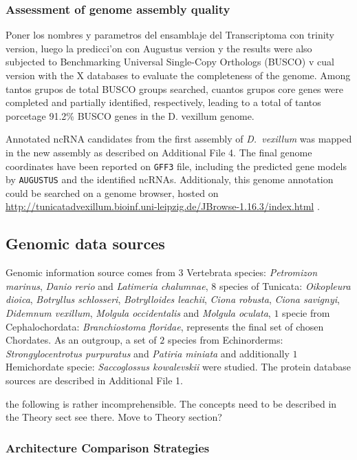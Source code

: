 \documentclass[11pt]{article}
\newcommand{\TODO}[1]{\begingroup\color{red}#1\endgroup}
\newcommand{\CAVH}[1]{\begingroup\color{green}#1\endgroup}
\begin{document}
\subsubsection*{Assessment of genome assembly quality} 
\TODO{Poner los nombres y parametros del ensamblaje del Transcriptoma con trinity
version, luego la predicci'on con Augustus version y the results  were also
subjected to Benchmarking Universal Single-Copy Orthologs (BUSCO) v cual version
with the \TODO{X databases} to evaluate the completeness of the genome. Among
tantos grupos de  total BUSCO groups searched, cuantos grupos core genes were
completed and partially identified, respectively, leading to a total of tantos
porcetage 91.2\% BUSCO genes in the D. vexillum genome.}

Annotated ncRNA candidates from the first assembly of \textit{D.\ vexillum} was
mapped in the new assembly as described on Additional File 4. The final genome
coordinates have been reported on \texttt{GFF3} file, including the predicted
gene models by \texttt{AUGUSTUS} and the identified ncRNAs. Additionaly, this
genome annotation could be searched on a genome browser, hosted on
\url{http://tunicatadvexillum.bioinf.uni-leipzig.de/JBrowse-1.16.3/index.html}
\cite{}.

\subsection*{Genomic data sources}

Genomic information source comes from $3$ Vertebrata species:
\textit{Petromizon marinus}, \textit{Danio rerio} and 
\textit{Latimeria chalumnae}, $8$ species of Tunicata: \textit{Oikopleura 
dioica}, \textit{Botryllus schlosseri}, \textit{Botrylloides 
leachii}, \textit{Ciona robusta}, \textit{Ciona savignyi}, \textit{Didemnum 
vexillum}, \textit{Molgula occidentalis} and \textit{Molgula oculata}, $1$ specie 
from Cephalochordata: \textit{Branchiostoma floridae}, represents the final set 
of chosen Chordates. As an outgroup, a set of $2$ species from Echinorderms: 
\textit{Strongylocentrotus purpuratus} and \textit{Patiria miniata} and 
additionally $1$ Hemichordate specie: \textit{Saccoglossus kowalevskii} were 
studied. The protein database sources are described in Additional File 1. 

\TODO{the following is rather incomprehensible. The concepts need to be described in the Theory sect 
see there.} \CAVH{Move to Theory section?}
\subsubsection*{Architecture Comparison Strategies}
\end{document}
